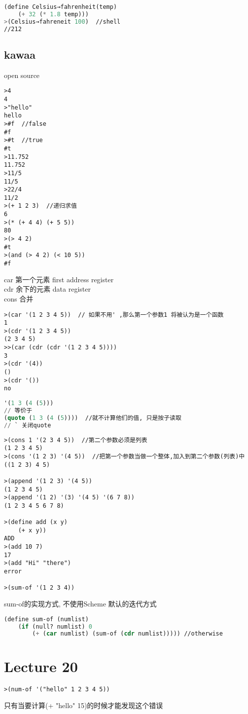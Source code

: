 \documentclass{article}
\begin{document}
\begin{lstlisting}[language = Lisp]
(define Celsius→fahrenheit(temp)
	(+ 32 (* 1.8 temp)))
>(Celsius→fahreneit 100)  //shell
//212
\end{lstlisting}

\subsection{kawaa}
open source
\begin{verbatim}
>4
4
>"hello"
hello
>#f  //false
#f
>#t  //true
#t
>11.752
11.752
>11/5
11/5
>22/4
11/2
>(+ 1 2 3)  //递归求值
6
>(* (+ 4 4) (+ 5 5))
80
>(> 4 2)
#t
>(and (> 4 2) (< 10 5))
#f
\end{verbatim}

\bigskip\noindent
car 第一个元素 first  address register\\
cdr 余下的元素  data register\\
cons 合并\\
\begin{verbatim}
>(car '(1 2 3 4 5))  // 如果不用' ,那么第一个参数1 将被认为是一个函数
1
>(cdr '(1 2 3 4 5))
(2 3 4 5)
>>(car (cdr (cdr '(1 2 3 4 5))))
3
>(cdr '(4))
()
>(cdr '())
no
\end{verbatim}

\begin{lstlisting}[language = Lisp]
'(1 3 (4 (5)))
// 等价于
(quote (1 3 (4 (5))))  //就不计算他们的值, 只是按子读取
// ` 关闭quote
\end{lstlisting}

\begin{verbatim}
>(cons 1 '(2 3 4 5))  //第二个参数必须是列表
(1 2 3 4 5)
>(cons '(1 2 3) '(4 5))  //把第一个参数当做一个整体,加入到第二个参数(列表)中
((1 2 3) 4 5)

>(append '(1 2 3) '(4 5))
(1 2 3 4 5)
>(append '(1 2) '(3) '(4 5) '(6 7 8))
(1 2 3 4 5 6 7 8)

>(define add (x y)
	(+ x y))
ADD
>(add 10 7)
17
>(add "Hi" "there")
error

>(sum-of '(1 2 3 4))
\end{verbatim}

sum-of的实现方式, 不使用Scheme 默认的迭代方式
\begin{lstlisting}[language = Lisp]
(define sum-of (numlist)
	(if (null? numlist) 0
		(+ (car numlist) (sum-of (cdr numlist))))) //otherwise
\end{lstlisting}

\section{Lecture 20}
\begin{verbatim}
>(num-of '("hello" 1 2 3 4 5))
\end{verbatim}
只有当要计算(+ "hello" 15)的时候才能发现这个错误
\end{document}
